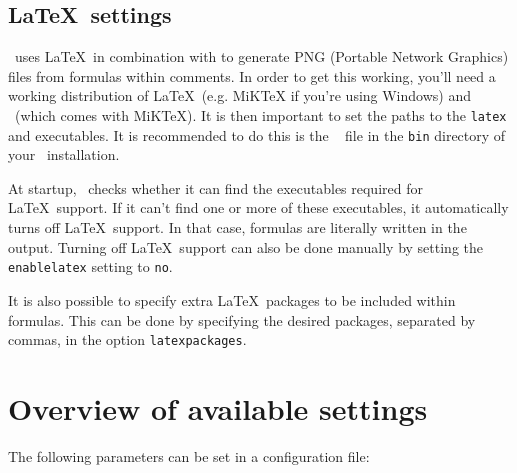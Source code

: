 \subsection{\LaTeX~settings}
\oxdoc~uses \LaTeX~in combination with \dvipng to generate PNG
(Portable Network Graphics) files from formulas within comments. In order to get this
working, you'll need a working distribution of \LaTeX~(e.g. MiKTeX
if you're using Windows) and \dvipng~(which comes with MiKTeX). It is then important
to set the paths to the {\tt latex} and \dvipng executables. It is recommended to do this is the \oxdocxml~
file in the {\tt bin} directory of your \oxdoc~installation.

At startup, \oxdoc~checks whether it can find the executables required for \LaTeX~support. If
it can't find one or more of these executables, it automatically turns off \LaTeX~support. In that case,
formulas are literally written in the output. Turning off \LaTeX~support can also be done manually by
setting the {\tt enablelatex} setting to {\tt no}.

It is also possible to specify extra \LaTeX~packages to be included within formulas. This can be done
by specifying the desired packages, separated by commas, in the option {\tt latexpackages}.



\section{Overview of available settings}
The following parameters can be set in a configuration file:\medskip

